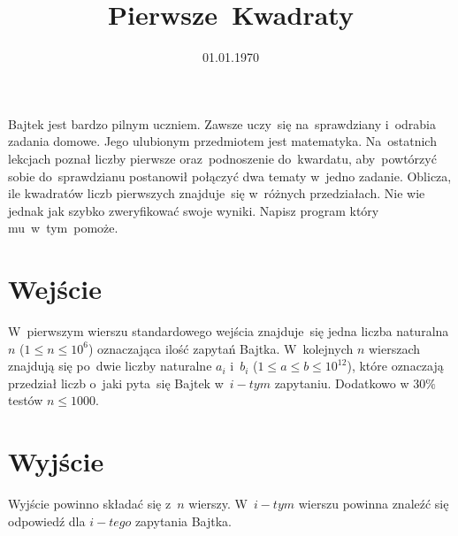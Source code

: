 \documentclass[zad]{soigstyl}
\date{01.01.1970}
\title{\mbox{Pierwsze Kwadraty}}
\begin{document}
\begin{tasktext}%
    \noindent
    Bajtek jest bardzo pilnym uczniem. Zawsze uczy~się na~sprawdziany i~odrabia zadania domowe. Jego ulubionym przedmiotem jest matematyka. Na~ostatnich lekcjach poznał liczby pierwsze oraz~podnoszenie do~kwardatu, aby~powtórzyć sobie do~sprawdzianu postanowił połączyć dwa tematy w~jedno zadanie. Oblicza, ile kwadratów liczb pierwszych znajduje~się w~różnych przedziałach. Nie wie jednak jak szybko zweryfikować swoje wyniki. Napisz program który mu~w~tym~pomoże.
	
    	\section{Wejście}
	W~pierwszym wierszu standardowego wejścia znajduje~się jedna liczba naturalna $n$ ($1 \leqslant n \leqslant 10^6$) oznaczająca ilość zapytań Bajtka. W~kolejnych $n$ wierszach znajdują się po~dwie liczby naturalne $a_i$ i~$b_i$  ($1 \leqslant a \leqslant b \leqslant 10^{12}$), które oznaczają przedział liczb o~jaki pyta~się Bajtek w~$i-tym$ zapytaniu.
Dodatkowo w $30\%$ testów $n \leqslant 1000$.

	\section{Wyjście}
	Wyjście powinno składać się z~$n$ wierszy. W~$i-tym$ wierszu powinna znaleźć się odpowiedź dla $i-tego$ zapytania Bajtka.
	
	\oigprzyklady
\end{tasktext}
\end{document}

